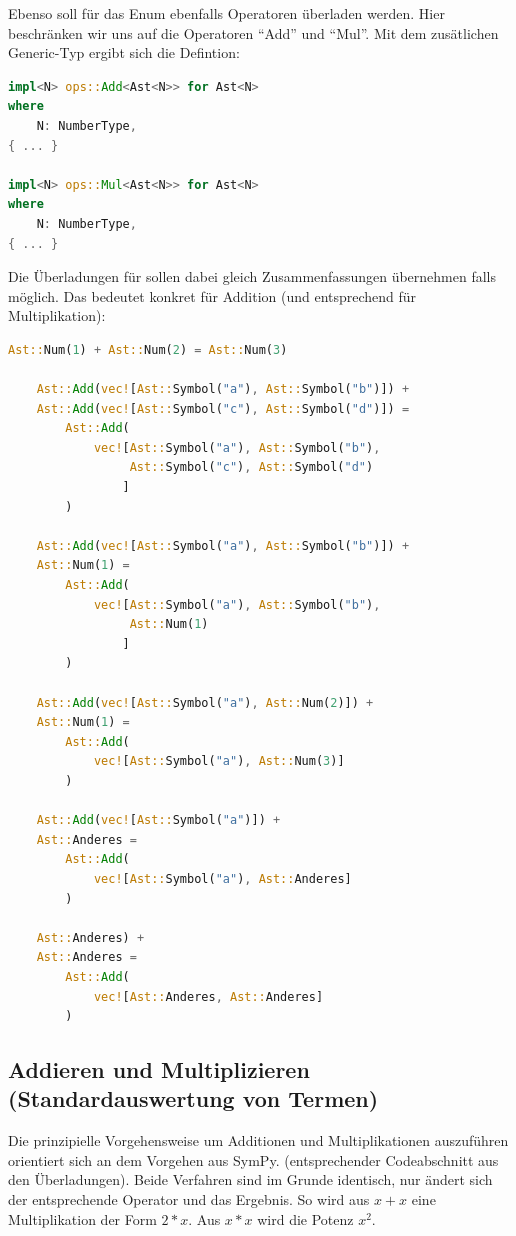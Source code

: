 \documentclass[11pt,a4paper, ngerman]{article}
\begin{document}
Ebenso soll für das Enum  ebenfalls Operatoren überladen werden. Hier beschränken wir uns auf die Operatoren ``Add'' und ``Mul''. Mit dem zusätlichen Generic-Typ ergibt sich die Defintion:

\begin{lstlisting}[language=rust, caption={Ast Operatorenüberladung}]
impl<N> ops::Add<Ast<N>> for Ast<N>
where
    N: NumberType,
{ ... }

impl<N> ops::Mul<Ast<N>> for Ast<N>
where
    N: NumberType,
{ ... }
\end{lstlisting}

Die Überladungen für  sollen dabei gleich Zusammenfassungen übernehmen falls möglich. Das bedeutet konkret für Addition (und entsprechend für Multiplikation):

\begin{lstlisting}[language=rust, caption={smarte Operatenüberladung}]
    Ast::Num(1) + Ast::Num(2) = Ast::Num(3)

    Ast::Add(vec![Ast::Symbol("a"), Ast::Symbol("b")]) +
    Ast::Add(vec![Ast::Symbol("c"), Ast::Symbol("d")]) = 
        Ast::Add(
            vec![Ast::Symbol("a"), Ast::Symbol("b"), 
                 Ast::Symbol("c"), Ast::Symbol("d")
                ]
        )

    Ast::Add(vec![Ast::Symbol("a"), Ast::Symbol("b")]) +
    Ast::Num(1) =
        Ast::Add(
            vec![Ast::Symbol("a"), Ast::Symbol("b"), 
                 Ast::Num(1)
                ]
        )

    Ast::Add(vec![Ast::Symbol("a"), Ast::Num(2)]) +
    Ast::Num(1) =
        Ast::Add(
            vec![Ast::Symbol("a"), Ast::Num(3)]
        )

    Ast::Add(vec![Ast::Symbol("a")]) +
    Ast::Anderes =
        Ast::Add(
            vec![Ast::Symbol("a"), Ast::Anderes]
        )

    Ast::Anderes) +
    Ast::Anderes =
        Ast::Add(
            vec![Ast::Anderes, Ast::Anderes]
        )
\end{lstlisting}

\subsection{Addieren und Multiplizieren (Standardauswertung von Termen)}
Die prinzipielle Vorgehensweise um Additionen und Multiplikationen auszuführen orientiert sich an dem Vorgehen aus SymPy. (entsprechender Codeabschnitt aus den Überladungen). Beide Verfahren sind im Grunde identisch, nur ändert sich der entsprechende Operator und das Ergebnis. So wird aus $x+x$ eine Multiplikation der Form $2*x$. Aus $x*x$ wird die Potenz $x^2$. 
\end{document}
